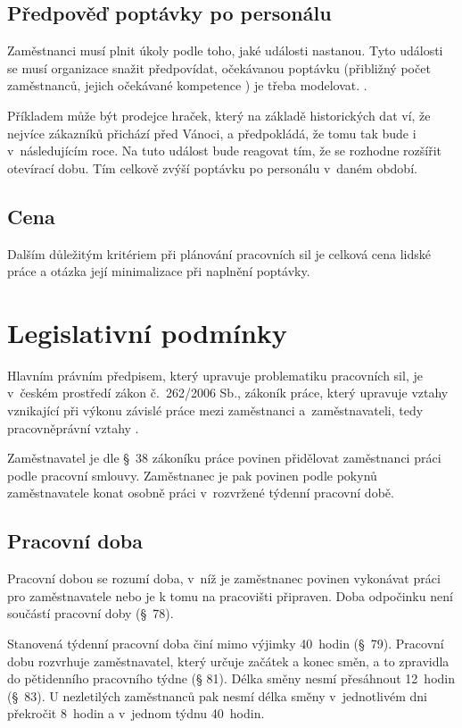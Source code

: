 \documentclass[a4paper,11pt,openany,twoside]{book}
\begin{document}
\subsection{Předpověď poptávky po personálu}
\label{sub:demand}
Zaměstnanci musí plnit úkoly podle toho, jaké události nastanou. Tyto události se musí organizace snažit předpovídat, očekávanou poptávku (přibližný počet zaměstnanců, jejich očekávané kompetence \cite[s.~219]{armstrong2014}) je třeba modelovat. \cite{ernst2004staff}.

Příkladem může být prodejce hraček, který na základě historických dat ví, že nejvíce zákazníků přichází před Vánoci, a předpokládá, že tomu tak bude i v~následujícím roce. Na tuto událost bude reagovat tím, že se rozhodne rozšířit otevírací dobu. Tím celkově zvýší poptávku po personálu v~daném období.

\subsection{Cena}
Dalším důležitým kritériem při plánování pracovních sil je celková cena lidské práce a otázka její minimalizace při naplnění poptávky.


\section{Legislativní podmínky}
\label{section:legislativa}
Hlavním právním předpisem, který upravuje problematiku pracovních sil, je v~českém prostředí zákon č.~262/2006 Sb., zákoník práce, který upravuje vztahy vznikající při výkonu závislé práce mezi zaměstnanci a~zaměstnavateli, tedy pracovněprávní vztahy \cite{zakonik06-262}.

Zaměstnavatel je dle §~38 zákoníku práce povinen přidělovat zaměstnanci práci podle pracovní smlouvy. Zaměstnanec je pak povinen podle pokynů zaměstnavatele konat osobně práci v~rozvržené týdenní pracovní době.

\subsection{Pracovní doba}
Pracovní dobou se rozumí doba, v~níž je zaměstnanec povinen vykonávat práci pro zaměstnavatele nebo je k tomu na pracovišti připraven. Doba odpočinku není součástí pracovní doby (§~78).

Stanovená týdenní pracovní doba činí mimo výjimky 40~hodin (§~79). Pracovní dobu rozvrhuje zaměstnavatel, který určuje začátek a konec směn, a to zpravidla do pětidenního pracovního týdne (§ 81). Délka směny nesmí přesáhnout 12~hodin (§~83). U nezletilých zaměstnanců pak nesmí délka směny v~jednotlivém dni překročit 8~hodin a v~jednom týdnu 40~hodin.
\end{document}
